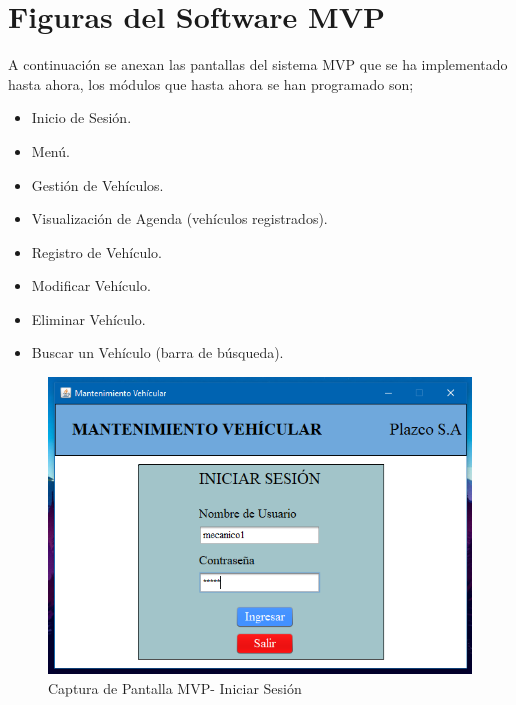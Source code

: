 \chapter{Figuras del Software MVP}
A continuación se anexan las pantallas del sistema MVP que se ha implementado hasta ahora, los módulos que hasta ahora se han programado son;
\begin{itemize}
	\item Inicio de Sesión.
	\item Menú.
	\item Gestión de Vehículos.
	\item Visualización de Agenda (vehículos registrados).
	\item Registro de Vehículo.
	\item Modificar Vehículo.
	\item Eliminar Vehículo.
	\item Buscar un Vehículo (barra de búsqueda).
\end{itemize}

\begin{figure}
	\centering
	\includegraphics[width=1\textwidth]{./apendice/imagenes/login}
	\caption{Captura de Pantalla MVP- Iniciar Sesión}
	\label{fig:Captura de Pantalla MVP- Iniciar Sesion}
\end{figure}

